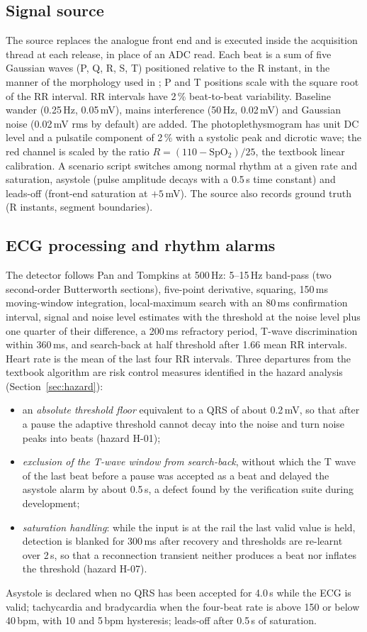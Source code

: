 \documentclass[preprint,3p,10pt]{elsarticle}
\begin{document}
\subsection{Signal source}
The source replaces the analogue front end and is executed inside the acquisition thread at each release, in place of an ADC read. Each beat is a sum of five Gaussian waves (P, Q, R, S, T) positioned relative to the R instant, in the manner of the morphology used in \cite{mcsharry2003}; P and T positions scale with the square root of the RR interval. RR intervals have 2\,\% beat-to-beat variability. Baseline wander (0.25\,Hz, 0.05\,mV), mains interference (50\,Hz, 0.02\,mV) and Gaussian noise (0.02\,mV rms by default) are added. The photoplethysmogram has unit DC level and a pulsatile component of 2\,\% with a systolic peak and dicrotic wave; the red channel is scaled by the ratio $R=(110-\mathrm{SpO_2})/25$, the textbook linear calibration. A scenario script switches among normal rhythm at a given rate and saturation, asystole (pulse amplitude decays with a 0.5\,s time constant) and leads-off (front-end saturation at $+5$\,mV). The source also records ground truth (R instants, segment boundaries).

\subsection{ECG processing and rhythm alarms}
The detector follows Pan and Tompkins \cite{pan1985} at 500\,Hz: 5--15\,Hz band-pass (two second-order Butterworth sections), five-point derivative, squaring, 150\,ms moving-window integration, local-maximum search with an 80\,ms confirmation interval, signal and noise level estimates with the threshold at the noise level plus one quarter of their difference, a 200\,ms refractory period, T-wave discrimination within 360\,ms, and search-back at half threshold after 1.66 mean RR intervals. Heart rate is the mean of the last four RR intervals. Three departures from the textbook algorithm are risk control measures identified in the hazard analysis (Section~\ref{sec:hazard}):
\begin{itemize}
\item an \emph{absolute threshold floor} equivalent to a QRS of about 0.2\,mV, so that after a pause the adaptive threshold cannot decay into the noise and turn noise peaks into beats (hazard H-01);
\item \emph{exclusion of the T-wave window from search-back}, without which the T wave of the last beat before a pause was accepted as a beat and delayed the asystole alarm by about 0.5\,s, a defect found by the verification suite during development;
\item \emph{saturation handling}: while the input is at the rail the last valid value is held, detection is blanked for 300\,ms after recovery and thresholds are re-learnt over 2\,s, so that a reconnection transient neither produces a beat nor inflates the threshold (hazard H-07).
\end{itemize}
Asystole is declared when no QRS has been accepted for 4.0\,s while the ECG is valid; tachycardia and bradycardia when the four-beat rate is above 150 or below 40\,bpm, with 10 and 5\,bpm hysteresis; leads-off after 0.5\,s of saturation.
\end{document}
